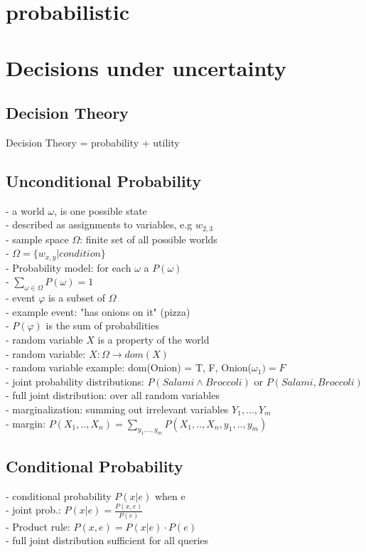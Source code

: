 \section{probabilistic}
\section*{Decisions under uncertainty}
\subsection*{Decision Theory}
Decision Theory = probability + utility 
\subsection*{Unconditional Probability}
- a world $\omega$, is one possible state \\
- described as assignments to variables, e.g $w_{2,3} $\\
- sample space $\Omega$: finite set of all possible worlds \\
- $\Omega = \{w_{x,y} | condition\}$\\
- Probability model: for each  $\omega$ a $P(\omega)$\\
- $\sum_{\omega \in \Omega} P(\omega) = 1$ \\
- event $\varphi$ is a subset of $\Omega$\\
- example event: "has onions on it" (pizza) \\
- $P(\varphi)$ is the sum of probabilities \\
- random variable $X$ is a property of the world \\
- random variable: $X: \Omega \rightarrow dom(X)$ \\
- random variable example: dom(Onion) = {T, F}, Onion($\omega_{1}) = F$ \\
- joint probability distributions: $P(Salami \land Broccoli)$ or $P(Salami, Broccoli)$\\
- full joint distribution: over all random variables \\
- marginalization: summing out irrelevant variables $Y_1, ..., Y_m$ \\
- margin: $P(X_1, .., X_n) = \sum_{y_1, .., y_m} P(X_1, ..,X_n, y_1, .., y_m)$ 



\subsection*{Conditional Probability}
- conditional probability $P(x | e)$ when e \\
- joint prob.: $P(x | e) =  \frac{P(x, e)}{P(e)}$ \\
- Product rule: $P(x,  e) = P(x | e) \cdot P(e)$ \\
- full joint distribution sufficient for all queries

